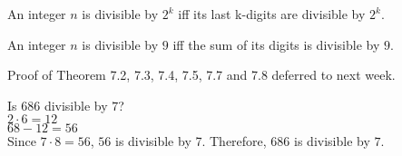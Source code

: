 \begin{theorem}
An integer $n$ is divisible by $2^k$ iff its last k-digits are divisible by $2^k$.
\end{theorem}

\begin{theorem}
An integer $n$ is divisible by $9$ iff the sum of its digits is divisible by $9$.
\end{theorem}

\bigskip
\noindent
Proof of Theorem 7.2, 7.3, 7.4, 7.5, 7.7 and 7.8 deferred to next week.

\bigskip
\begin{example}
Is $686$ divisible by $7$? \\
$2 \cdot 6 = 12$ \\
$68 - 12 = 56$ \\
Since $7 \cdot 8 = 56$, $56$ is divisible by 7. Therefore, $686$ is divisible by $7$.
\end{example}